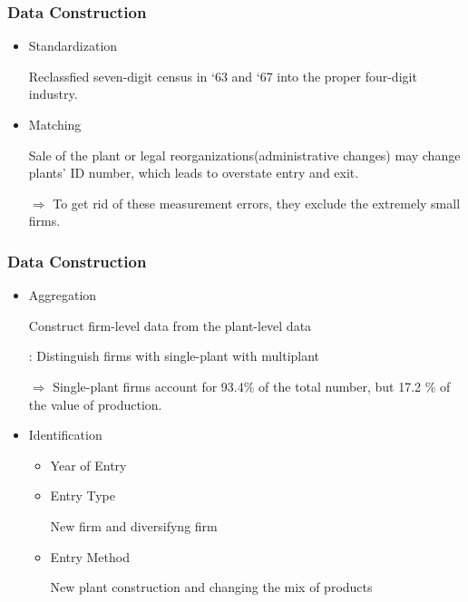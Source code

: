 \documentclass[dvipdfmx,12pt]{beamer}
\begin{document}
\begin{frame}\frametitle{Data Construction}

 \begin{itemize}
 
 \item Standardization
 
 Reclassfied seven-digit census in `63 and `67 into the proper four-digit industry.
 
 \item Matching
 
 Sale of the plant or legal reorganizations(administrative changes) may change plants' ID number, which leads to overstate entry and exit.
 
 $\Rightarrow$ To get rid of these measurement errors, they exclude the extremely small firms.
 
 \end{itemize}
 
\end{frame}

\begin{frame}\frametitle{Data Construction}

 \begin{itemize}
 
 \item Aggregation
 
 Construct firm-level data from the plant-level data
 
 : Distinguish firms with single-plant with multiplant
 
 $\Rightarrow$ Single-plant firms account for 93.4\% of the total number, but 17.2 \% of the value of production.
 
 \item Identification
 
  \begin{itemize}
  
  \item Year of Entry
  
  \item Entry Type
  
  New firm and diversifyng firm
  
  \item Entry Method
  
  New plant construction and changing the mix of products
  
  \end{itemize}
 
 \end{itemize}

\end{frame}
\end{document}
